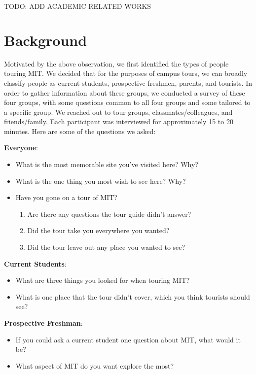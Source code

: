 \documentclass{sigchi}
\begin{document}
TODO: ADD ACADEMIC RELATED WORKS

\section{Background}

Motivated by the above observation, we first identified the types of people touring MIT. We decided that for the purposes of campus tours, we can broadly classify people as current students, prospective freshmen, parents, and tourists. In order to gather information about these groups, we conducted a survey of these four groups, with some questions common to all four groups and some tailored to a specific group. We reached out to tour groups, classmates/colleagues, and friends/family. Each participant was interviewed for approximately 15 to 20 minutes. Here are some of the questions we asked:

\textbf{Everyone}:

\begin{itemize}
	\item What is the most memorable site you've visited here? Why?
	\item What is the one thing you most wish to see here? Why?
	\item Have you gone on a tour of MIT?
	\begin{enumerate}
		\item Are there any questions the tour guide didn't answer?
		\item Did the tour take you everywhere you wanted?
		\item Did the tour leave out any place you wanted to see?
	\end{enumerate}
\end{itemize}

\textbf{Current Students}:
\begin{itemize}
	\item What are three things you looked for when touring MIT?
	\item What is one place that the tour didn't cover, which you think tourists should see?
\end{itemize}

\textbf{Prospective Freshman}:
\begin{itemize}
	\item If you could ask a current student one question about MIT, what would it be?
	\item What aspect of MIT do you want explore the most?
\end{itemize}
\end{document}
